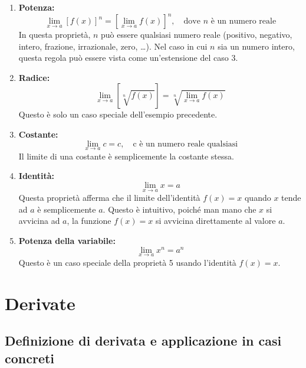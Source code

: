 \documentclass{article}
\begin{document}
\begin{enumerate}
    \item \textbf{Potenza:}
    \begin{equation*}
        \lim_{x \to a} [f(x)]^n = \left[\lim_{x \to a} f(x)\right]^n, \quad \text{dove } n \text{ è un numero reale}
    \end{equation*}
    In questa proprietà, \(n\) può essere qualsiasi numero reale (positivo, negativo, intero,
    frazione, irrazionale, zero, \dots). Nel caso in cui \(n\) sia un numero intero, questa
    regola può essere vista come un'estensione del caso 3.
    
    \item \textbf{Radice:}
    \begin{equation*}
        \lim_{x \to a} \left[ \sqrt[n]{f(x)} \right] = \sqrt[n]{\lim_{x \to a} f(x)}
    \end{equation*}
    Questo è solo un caso speciale dell'esempio precedente.
    
    \item \textbf{Costante:}
    \begin{equation*}
        \lim_{x \to a} c = c, \quad \text{c è un numero reale qualsiasi}
    \end{equation*}
    Il limite di una costante è semplicemente la costante stessa.
    
    \item \textbf{Identità:}
    \begin{equation*}
        \lim_{x \to a} x = a
    \end{equation*}
    Questa proprietà afferma che il limite dell'identità \(f(x) = x\) quando \(x\)
    tende ad \(a\) è semplicemente \(a\). Questo è intuitivo, poiché man mano che \(x\) si
    avvicina ad \(a\), la funzione \(f(x) = x\) si avvicina direttamente al valore \(a\).
    
    \item \textbf{Potenza della variabile:}
    \begin{equation*}
        \lim_{x \to a} x^n = a^n
    \end{equation*}
    Questo è un caso speciale della proprietà 5 usando l'identità \(f(x) = x\).
\end{enumerate}

\newpage
\section{Derivate}
\subsection{Definizione di derivata e applicazione in casi concreti}
\end{document}
